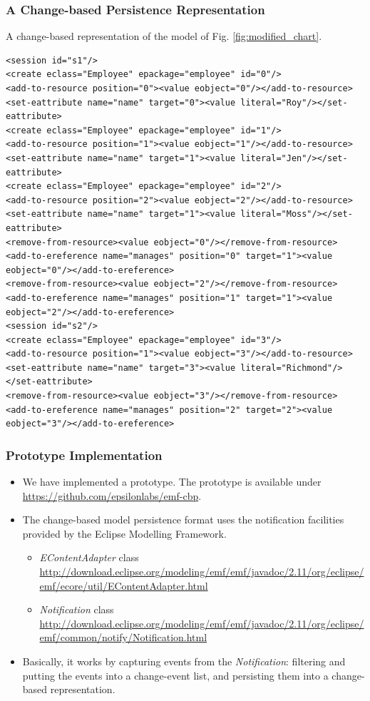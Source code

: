 \documentclass{beamer}
\begin{document}
\begin{frame}[fragile]
\frametitle{A Change-based Persistence Representation}
A change-based representation of the model of Fig. \ref{fig:modified_chart}.
\begin{lstlisting}[style=xml,label=lst:cbpmodel]
<session id="s1"/>
<create eclass="Employee" epackage="employee" id="0"/>
<add-to-resource position="0"><value eobject="0"/></add-to-resource>
<set-eattribute name="name" target="0"><value literal="Roy"/></set-eattribute>
<create eclass="Employee" epackage="employee" id="1"/>
<add-to-resource position="1"><value eobject="1"/></add-to-resource>
<set-eattribute name="name" target="1"><value literal="Jen"/></set-eattribute>
<create eclass="Employee" epackage="employee" id="2"/>
<add-to-resource position="2"><value eobject="2"/></add-to-resource>
<set-eattribute name="name" target="1"><value literal="Moss"/></set-eattribute>
<remove-from-resource><value eobject="0"/></remove-from-resource>
<add-to-ereference name="manages" position="0" target="1"><value eobject="0"/></add-to-ereference>
<remove-from-resource><value eobject="2"/></remove-from-resource>
<add-to-ereference name="manages" position="1" target="1"><value eobject="2"/></add-to-ereference>
<session id="s2"/>
<create eclass="Employee" epackage="employee" id="3"/>
<add-to-resource position="1"><value eobject="3"/></add-to-resource>
<set-eattribute name="name" target="3"><value literal="Richmond"/></set-eattribute>
<remove-from-resource><value eobject="3"/></remove-from-resource>
<add-to-ereference name="manages" position="2" target="2"><value eobject="3"/></add-to-ereference>
\end{lstlisting}
\end{frame}

\begin{frame}
\frametitle{Prototype Implementation}
\begin{itemize}
\item We have implemented a prototype. The prototype is available under \url{https://github.com/epsilonlabs/emf-cbp}.
\item The change-based model persistence format uses the notification facilities provided by the Eclipse Modelling Framework. 
\begin{itemize}
\item \emph{EContentAdapter} class  {\tiny \url{http://download.eclipse.org/modeling/emf/emf/javadoc/2.11/org/eclipse/emf/ecore/util/EContentAdapter.html}} 
\item \emph{Notification} class {\tiny\url{http://download.eclipse.org/modeling/emf/emf/javadoc/2.11/org/eclipse/emf/common/notify/Notification.html}}
\end{itemize}
\item Basically, it works by capturing events from the \emph{Notification}: filtering and putting the events into a change-event list, and persisting them into a change-based representation.
\end{itemize}
\end{frame}
\end{document}
